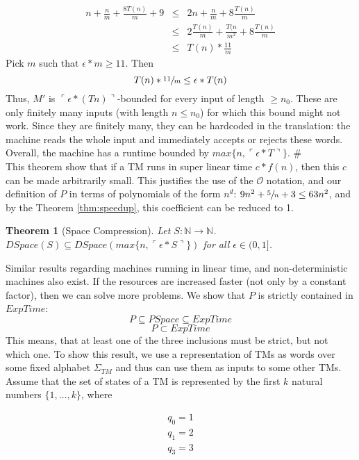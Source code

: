 \documentclass{report}
\newtheorem{theorem}[definition]{Theorem}
\begin{document}
\[
\begin{array}{rll}
n+\frac{n}{m}+\frac{8T(n)}{m}+9 &\leq &2n + \frac{n}{m} + 8 \frac{T(n)}{m}\\
&\leq &2 \frac{T(n)}{m} + \frac{T(n}{m^2}+8\frac{T(n)}{m}\\
&\leq &T(n) * \frac{11}{m}
\end{array}
\]
Pick $m$ such that $\epsilon*m\geq11$. Then 
\[ T(n) * \sfrac{11}{m} \leq \epsilon*T(n)\]
Thus, $M'$ is $\ulcorner\epsilon*(Tn)\urcorner$-bounded for every input of length $\geq n_0$. These are only finitely many inputs (with length $n\leq n_0$) for which this bound might not work. Since they are finitely many, they can be hardcoded in the translation: the machine reads the whole input and immediately accepts or rejects these words. Overall, the machine has a runtime bounded by  $max\{n, \ulcorner\epsilon*T\urcorner\}$. \#\\

This theorem show that if a TM runs in super linear time $c*f(n)$, then this $c$ can be made arbitrarily small. This justifies the use of the $\mathcal{O}$ notation, and our definition of $P$ in terms of polynomials of the form $n^d$: $9n^2 + \sfrac{5}{n} + 3 \leq 63n^2$, and by the Theorem \ref{thm:speedup}, this coefficient can be reduced to 1.

\begin{theorem}[Space Compression]\label{thm:space-compression}
Let $S:\mathbb{N}\rightarrow \mathbb{N}$.\\$DSpace(S) \subseteq DSpace(max\{n,\ulcorner \epsilon*S \urcorner\})$ for all $\epsilon \in (0,1]$.
\end{theorem}
Similar results regarding machines running in linear time, and non-deterministic machines also exist. If the resources are increased faster (not only by a constant factor), then we can solve more problems. We show that $P$ is strictly contained in $ExpTime$:
\[P \subseteq PSpace \subseteq ExpTime \]\[
P \subset ExpTime \]
This means, that at least one of the three inclusions must be strict, but not which one. To show this result, we use a representation of TMs as words over some fixed alphabet $\Sigma_{TM}$ and thus can use them as inputs to some other TMs. Assume that the set of states of a TM is represented by the first $k$ natural numbers $\{1, \dots, k\}$, where

\[\begin{array}{c}
q_0 = 1\\
q_1 = 2\\
q_3 = 3
\end{array}\]
\end{document}
